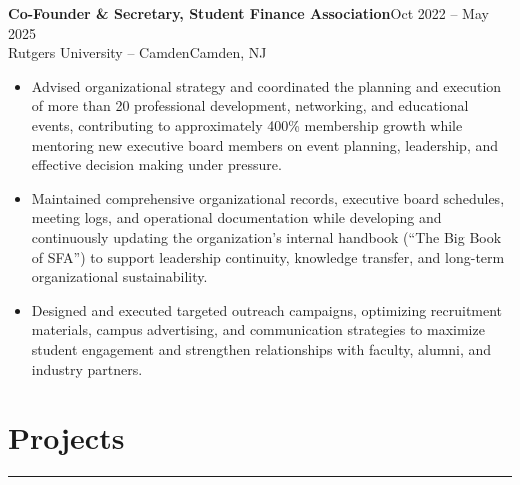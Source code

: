 \documentclass[11pt]{article}
\newcommand{\resheading}[1]{%
  \Needspace{6\baselineskip}%
  \section*{#1}\vspace{-4pt}\color{rulegray}\hrule\vspace{4pt}\color{black}
}
\newcommand{\workentry}[4]{%
  \Needspace{7\baselineskip}%
  \textbf{#1}\hfill #2\\[-1pt]%
  #3\hfill #4\\[-8pt]%
}
\newenvironment{tightitemize}{%
  \vspace{-2pt}%
  \begin{itemize}[leftmargin=*,topsep=0pt,itemsep=1pt,parsep=0pt,partopsep=0pt]
}{%
  \end{itemize}\vspace{4pt}
}
\begin{document}
\workentry
{Co-Founder \& Secretary, Student Finance Association}
{Oct 2022 -- May 2025}
{Rutgers University -- Camden}
{Camden, NJ}
\begin{tightitemize}
\item Advised organizational strategy and coordinated the planning and execution of more than 20 professional development, networking, and educational events, contributing to approximately 400\% membership growth while mentoring new executive board members on event planning, leadership, and effective decision making under pressure.
\item Maintained comprehensive organizational records, executive board schedules, meeting logs, and operational documentation while developing and continuously updating the organization's internal handbook (``The Big Book of SFA'') to support leadership continuity, knowledge transfer, and long-term organizational sustainability.
\item Designed and executed targeted outreach campaigns, optimizing recruitment materials, campus advertising, and communication strategies to maximize student engagement and strengthen relationships with faculty, alumni, and industry partners.
\end{tightitemize}


\resheading{Projects}
\end{document}
